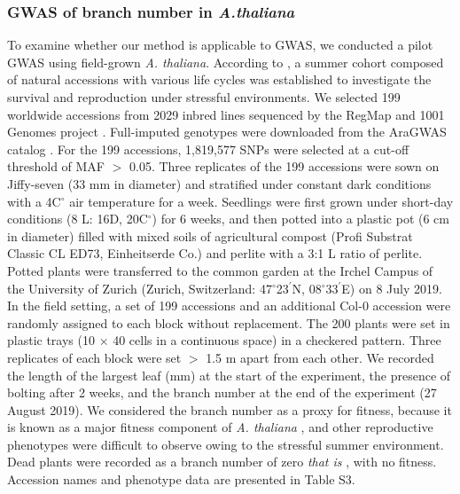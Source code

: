 \documentclass[12pt,]{article}
\begin{document}
\subsubsection{GWAS of branch number in \textit{A.thaliana}}
To examine whether our method is applicable to GWAS, we conducted a pilot GWAS using field-grown \textit{A. thaliana}. According to \cite{sato2019plant}, a summer cohort composed of natural accessions with various life cycles was established to investigate the survival and reproduction under stressful environments. We selected 199 worldwide accessions from 2029 inbred lines sequenced by the RegMap \citep{horton_genome-wide_2012} and 1001 Genomes project \citep{alonso-blanco_1135_2016}. Full-imputed genotypes were downloaded from the AraGWAS catalog \citep{togninalli_aragwas_2018}. For the 199 accessions, 1,819,577 SNPs were selected at a cut-off threshold of MAF $>$ 0.05. Three replicates of the 199 accessions were sown on Jiffy-seven (33 mm in diameter) and stratified under constant dark conditions with a 4C$^{\circ}$ air temperature for a week. Seedlings were first grown under short-day conditions (8 L: 16D, 20C$^{\circ}$) for 6 weeks, and then potted into a plastic pot (6 cm in diameter) filled with mixed soils of agricultural compost (Profi Substrat Classic CL ED73, Einheitserde Co.) and perlite with a 3:1 L ratio of perlite. Potted plants were transferred to the common garden at the Irchel Campus of the University of Zurich (Zurich, Switzerland: 47$^\circ$23$^\prime$N, 08$^\circ$33$^\prime$E) on 8 July 2019. In the field setting, a set of 199 accessions and an additional Col-0 accession were randomly assigned to each block without replacement. The 200 plants were set in plastic trays (10 $\times$ 40 cells in a continuous space) in a checkered pattern. Three replicates of each block were set $>$ 1.5 m apart from each other. We recorded the length of the largest leaf (mm) at the start of the experiment, the presence of bolting after 2 weeks, and the branch number at the end of the experiment (27 August 2019). We considered the branch number as a proxy for fitness, because it is known as a major fitness component of \textit{A. thaliana} \citep{chong2018note}, and other reproductive phenotypes were difficult to observe owing to the stressful summer environment. Dead plants were recorded as a branch number of zero \textit{ that is }, with no fitness. Accession names and phenotype data are presented in Table S3.
\end{document}
